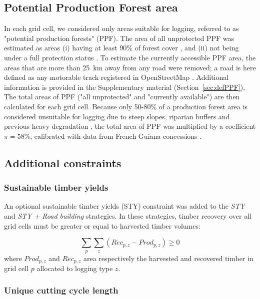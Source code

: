 \documentclass{article}
\begin{document}
\subsection{Potential Production Forest area}
\label{sec:ppf}

In each grid cell, we considered only areas suitable for logging, referred to as "potential production forests" (PPF). The area of all unprotected PPF was estimated as areas (i) having at least 90\% of forest cover \cite{Hansen2013}, and (ii) not being under a full protection status \cite{WDPA2016}. To estimate the currently accessible PPF area, the areas that are more than 25~km away from any road were removed; a road is here defined as any motorable track registered in OpenStreetMap \cite{OSM2018}. Additional information is provided in the Supplementary material (Section~\ref{sec:defPPF}). 
The total areas of PPF ("all unprotected" and "currently available") are then calculated for each grid cell. Because only 50-80\% of a production forest area is considered unsuitable for logging  due to steep slopes, riparian buffers and previous heavy degradation \cite{Feldpausch2006,Verissimo2002}, the total area of PPF was multiplied by a coefficient $\pi = 58\%$, calibrated with data from French Guiana concessions \cite{Piponiotc}.

\subsection{Additional constraints}

\subsubsection{Sustainable timber yields}

An optional sustainable timber yields (STY) constraint was added to the \textit{STY} and \textit{STY + Road building} strategies. In these strategies, timber recovery over all grid cells must be greater or equal to harvested timber volumes: 

\begin{equation}
    \sum_{p}\sum_{z} (Rec_{p,z} - Prod_{p,z}) \geq 0 
\end{equation}
where $Prod_{p,z}$ and $Rec_{p,z}$ area respectively the harvested and recovered timber in grid cell $p$ allocated to logging type $z$.

\subsubsection{Unique cutting cycle length}
\end{document}
